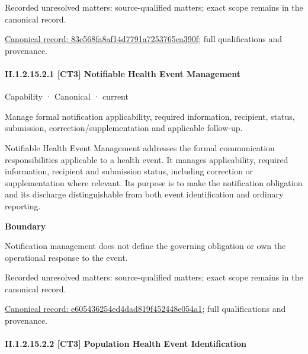 {\small Recorded unresolved matters: source-qualified matters; exact scope remains in the canonical record.}\par
{\footnotesize \href{../../../../../../../continuum/strategy/capability/83e568fa8af14d7791a7253765ea390f.md}{Canonical record: 83e568fa8af14d7791a7253765ea390f}; full qualifications and provenance.}\par
\paragraph*{II.1.2.15.2.1 [CT3] Notifiable Health Event Management}
\label{navigation:II.1.2.15.2.1}

\label{element:e605436254ed4dad819f452448e054a1}
{\small Capability · Canonical · current}\par

Manage formal notification applicability, required information, recipient, status, submission, correction/supplementation and applicable follow-up.



Notifiable Health Event Management addresses the formal communication responsibilities applicable to a health event. It manages applicability, required information, recipient and submission status, including correction or supplementation where relevant. Its purpose is to make the notification obligation and its discharge distinguishable from both event identification and ordinary reporting.



\textbf{Boundary}



Notification management does not define the governing obligation or own the operational response to the event.


{\small Recorded unresolved matters: source-qualified matters; exact scope remains in the canonical record.}\par
{\footnotesize \href{../../../../../../../continuum/strategy/capability/e605436254ed4dad819f452448e054a1.md}{Canonical record: e605436254ed4dad819f452448e054a1}; full qualifications and provenance.}\par
\paragraph*{II.1.2.15.2.2 [CT3] Population Health Event Identification}
\label{navigation:II.1.2.15.2.2}

